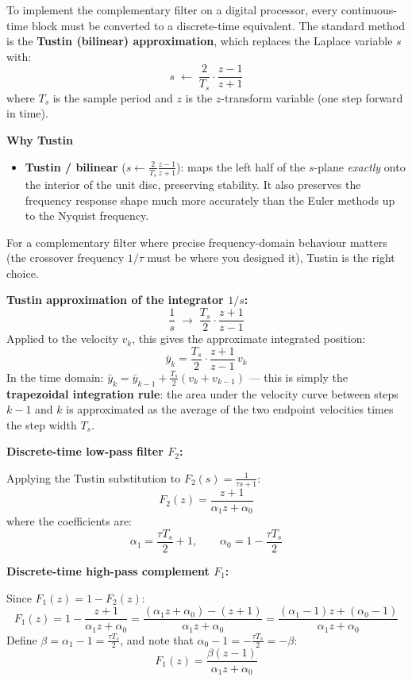 \documentclass[12pt, a4paper]{article}
\begin{document}
To implement the complementary filter on a digital processor, every
continuous-time block must be converted to a discrete-time equivalent.
The standard method is the \textbf{Tustin (bilinear) approximation}, which
replaces the Laplace variable $s$ with:
\[
  s \;\longleftarrow\; \frac{2}{T_s}\cdot\frac{z - 1}{z + 1}
\]
where $T_s$ is the sample period and $z$ is the $z$-transform variable
(one step forward in time).

\begin{notebox}
  \textbf{Why Tustin}
  \begin{itemize}
    \item \textbf{Tustin / bilinear} ($s \leftarrow \frac{2}{T_s}
      \frac{z-1}{z+1}$): maps the left half of the $s$-plane
      \emph{exactly} onto the interior of the unit disc, preserving
      stability.
      It also preserves the frequency response shape much more accurately
      than the Euler methods up to the Nyquist frequency.
  \end{itemize}
  For a complementary filter where precise frequency-domain behaviour
  matters (the crossover frequency $1/\tau$ must be where you designed it),
  Tustin is the right choice.
\end{notebox}

\textbf{Tustin approximation of the integrator $1/s$:}
\[
  \frac{1}{s}
  \;\longrightarrow\;
  \frac{T_s}{2}\cdot\frac{z + 1}{z - 1}
\]
Applied to the velocity $v_k$, this gives the approximate integrated position:
\[
  \bar{y}_k = \frac{T_s}{2}\cdot\frac{z+1}{z-1}\, v_k
\]
In the time domain: $\bar{y}_k = \bar{y}_{k-1} + \tfrac{T_s}{2}(v_k + v_{k-1})$
--- this is simply the \textbf{trapezoidal integration rule}: the area under
the velocity curve between steps $k{-}1$ and $k$ is approximated as the
average of the two endpoint velocities times the step width $T_s$.

\textbf{Discrete-time low-pass filter $F_2$:}

Applying the Tustin substitution to $F_2(s) = \tfrac{1}{\tau s + 1}$:
\[
  F_2(z) = \frac{z + 1}{\alpha_1 z + \alpha_0}
\]
where the coefficients are:
\[
  \alpha_1 = \frac{\tau T_s}{2} + 1, \qquad \alpha_0 = 1 - \frac{\tau T_s}{2}
\]

\textbf{Discrete-time high-pass complement $F_1$:}

Since $F_1(z) = 1 - F_2(z)$:
\[
  F_1(z)
  = 1 - \frac{z+1}{\alpha_1 z + \alpha_0}
  = \frac{(\alpha_1 z + \alpha_0) - (z+1)}{\alpha_1 z + \alpha_0}
  = \frac{(\alpha_1 - 1)z + (\alpha_0 - 1)}{\alpha_1 z + \alpha_0}
\]
Define $\beta = \alpha_1 - 1 = \tfrac{\tau T_s}{2}$, and note that
$\alpha_0 - 1 = -\tfrac{\tau T_s}{2} = -\beta$:
\[
  F_1(z) = \frac{\beta(z - 1)}{\alpha_1 z + \alpha_0}
\]
\end{document}
